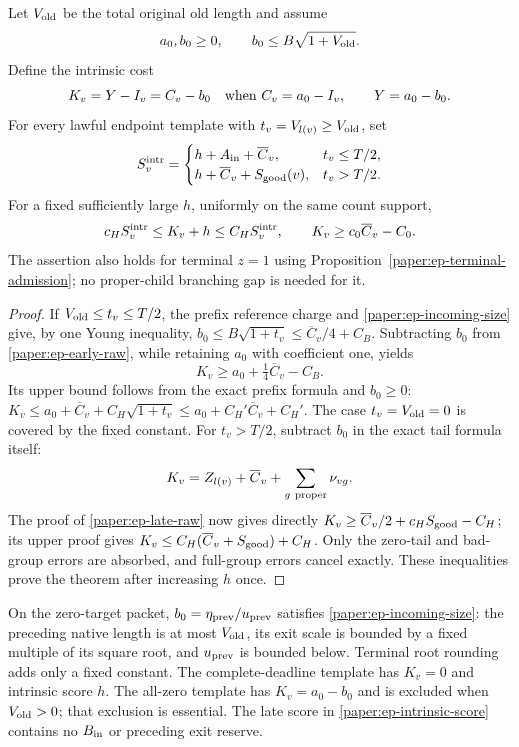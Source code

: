 \begin{theorem}\label{paper:ep-intrinsic}
Let $V_{\rm old}$ be the total original old length and assume
\begin{equation}\label{paper:ep-incoming-size}
 a_0,b_0\geq0,\qquad b_0\leq B\sqrt{1+V_{\rm old}}.
\end{equation}
Define the intrinsic cost
\[
 K_v=Y-I_v=C_v-b_0\quad\hbox{when }C_v=a_0-I_v,
 \qquad Y=a_0-b_0.
\]
For every lawful endpoint template with $t_v=V_{l(v)}\geq V_{\rm old}$,
set
\begin{equation}\label{paper:ep-intrinsic-score}
 S_v^{\rm intr}=\begin{cases}
 h+A_{\rm in}+\overline C_v,&t_v\leq T/2,\\
 h+\overline C_v+S_{\rm good}(v),&t_v>T/2.
 \end{cases}
\end{equation}
For a fixed sufficiently large $h$, uniformly on the same count support,
\begin{equation}\label{paper:ep-intrinsic-comparison}
 c_HS_v^{\rm intr}\leq K_v+h\leq C_HS_v^{\rm intr},\qquad
 K_v\geq c_0\overline C_v-C_0.
\end{equation}
The assertion also holds for terminal $z=1$ using
Proposition~\ref{paper:ep-terminal-admission}; no proper-child
branching gap is needed for it.
\end{theorem}
\begin{proof}
If $V_{\rm old}\leq t_v\leq T/2$, the prefix reference charge
and \eqref{paper:ep-incoming-size} give, by one Young inequality,
$b_0\leq B\sqrt{1+t_v}\leq\overline C_v/4+C_B$.
Subtracting $b_0$ from \eqref{paper:ep-early-raw}, while retaining
$a_0$ with coefficient one, yields
\[
 K_v\geq a_0+\tfrac14\overline C_v-C_B.
\]
Its upper bound follows from the exact prefix formula and $b_0\geq0$:
$K_v\leq a_0+\overline C_v+C_H\sqrt{1+t_v}
\leq a_0+C_H'\overline C_v+C_H'$.
The case $t_v=V_{\rm old}=0$ is covered by the fixed constant.
For $t_v>T/2$, subtract $b_0$ in the exact tail formula itself:
\[
 K_v=Z_{l(v)}+\overline C_v+
                         \sum_{g\ {\rm proper}}\nu_{vg}.
\]
The proof of \eqref{paper:ep-late-raw} now gives directly
$K_v\geq\overline C_v/2+c_HS_{\rm good}-C_H$;
its upper proof gives
$K_v\leq C_H(\overline C_v+S_{\rm good})+C_H$.
Only the zero-tail and bad-group errors are absorbed, and full-group
errors cancel exactly.  These inequalities prove the theorem after
increasing $h$ once.
\end{proof}
On the zero-target packet, $b_0=\eta_{\rm prev}/u_{\rm prev}$
satisfies \eqref{paper:ep-incoming-size}: the preceding native length
is at most $V_{\rm old}$, its exit scale is bounded by a fixed multiple
of its square root, and $u_{\rm prev}$ is bounded below.  Terminal
root rounding adds only a fixed constant.  The complete-deadline
template has $K_v=0$ and intrinsic score $h$.  The all-zero template
has $K_v=a_0-b_0$ and is excluded when $V_{\rm old}>0$; that exclusion
is essential.  The late score in \eqref{paper:ep-intrinsic-score}
contains no $B_{\rm in}$ or preceding exit reserve.

